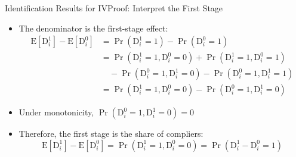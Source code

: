 \documentclass[dvipsnames,hyperref={pdfpagelabels=false}]{beamer}
\begin{document}
\begin{frame}{Identification Results for IV}{Proof: Interpret the First Stage}
	\begin{itemize}
		\item The denominator is the first-stage effect:
		\begin{equation*}
			\begin{aligned}
				\mathrm{E}[\mathrm{D}^{1}_{i}]-\mathrm{E}[\mathrm{D}^{0}_{i}] &= \Pr(\mathrm{D}^{1}_{i}=1) - \Pr(\mathrm{D}^{0}_{i}=1) \\
				&= \Pr(\mathrm{D}^{1}_{i}=1, \mathrm{D}^{0}_{i}=0) + \Pr(\mathrm{D}^{1}_{i}=1, \mathrm{D}^{0}_{i}=1) \\
				&\quad - \Pr(\mathrm{D}^{0}_{i}=1, \mathrm{D}^{1}_{i}=0) - \Pr(\mathrm{D}^{0}_{i}=1, \mathrm{D}^{1}_{i}=1) \\
				&= \Pr(\mathrm{D}^{1}_{i}=1, \mathrm{D}^{0}_{i}=0) - \Pr(\mathrm{D}^{0}_{i}=1, \mathrm{D}^{1}_{i}=0)
			\end{aligned}
		\end{equation*}
		\vspace{0.2cm}
		\item Under monotonicity, $\Pr(\mathrm{D}^{0}_{i}=1, \mathrm{D}^{1}_{i}=0) = 0$
		\vspace{0.2cm}
		\item Therefore, the first stage is the share of compliers:
		\begin{equation*}
			\mathrm{E}[\mathrm{D}^{1}_{i}]-\mathrm{E}[\mathrm{D}^{0}_{i}] = \Pr(\mathrm{D}^{1}_{i}=1, \mathrm{D}^{0}_{i}=0) = \Pr(\mathrm{D}^{1}_{i}-\mathrm{D}^{0}_{i}=1)
		\end{equation*}
	\end{itemize}
\end{frame}
\end{document}
